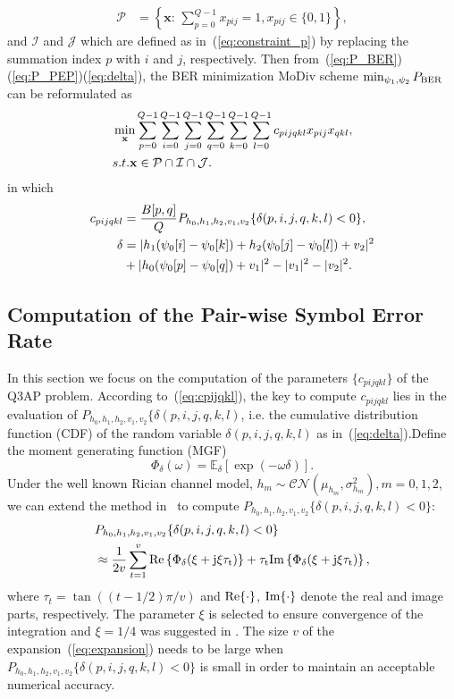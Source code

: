 \documentclass[journal]{IEEEtran}
\newcommand{\BER}{\rm{BER}}
\renewcommand{\Re}{\rm Re}
\renewcommand{\Im}{\rm Im}
\begin{document}
\begin{align}
    \mathcal{P} & = \left\{\mathbf{x}:\,\sum_{p=0}^{Q-1}x_{pij} = 1,
    x_{pij}\in\{0, 1\}\right\}, \label{eq:constraint_p}
\end{align}
and $\mathcal{I}$ and $\mathcal{J}$ which are defined as
in~(\ref{eq:constraint_p}) by replacing the summation index $p$ with $i$ and
$j$, respectively. Then from~(\ref{eq:P_BER})(\ref{eq:P_PEP})(\ref{eq:delta}),
the BER minimization MoDiv scheme $\min_{\psi_1, \psi_2}P_{\BER}$ can be
reformulated as
\begin{align}
    & \min_{\mathbf{x}}\sum_{p=0}^{Q-1}\sum_{i=0}^{Q-1}\sum_{j=0}^{Q-1}
    \sum_{q=0}^{Q-1}\sum_{k=0}^{Q-1}\sum_{l=0}^{Q-1}c_{pijqkl}x_{pij}x_{qkl},
    \label{eq:Q3AP}\\
    & \mbox{s.t. } \mathbf{x}\in \mathcal{P}\cap\mathcal{I}\cap\mathcal{J}.
    \notag
\end{align}
in which
\begin{align}
    c_{pijqkl} & = \frac{B[p, q]}{Q}P_{h_0,h_1,h_2,v_1,v_2}\{\delta(p,i,j,q,k,l)
    < 0\},
    \label{eq:cpijqkl} \\
    \delta & = |h_1(\psi_0[i] - \psi_0[k])+h_2(\psi_0[j] - \psi_0[l])+v_2|^2 
 \notag
    \\
    &
       + |h_0(\psi_0[p] - \psi_0[q]) + v_1|^2 - |v_1|^2 -
    |v_2|^2.\label{eq:delta_pijqkl}
\end{align}

\subsection{Computation of the Pair-wise Symbol Error Rate}

In this section we focus on the computation of the parameters $\{c_{pijqkl}\}$
of the Q3AP problem. According to~(\ref{eq:cpijqkl}), the key to compute
$c_{pijqkl}$ lies in the evaluation of
$P_{h_0,h_1,h_2,v_1,v_2}\{\delta(p,i,j,q,k,l)$, i.e. the cumulative distribution
function (CDF) of the random variable $\delta(p,i,j,q,k,l)$ as
in~(\ref{eq:delta}).Define the moment generating function (MGF)
\[\Phi_{\delta}(\omega) = \mathbb{E}_{\delta}[\exp(-\omega\delta)].\]
Under the well known Rician channel model, 
$h_m\sim\mathcal{CN}(\mu_{h_m},\sigma_{h_m}^2), m=0,1,2$, we 
can extend the method
in~\cite{harvind2005symbol, taricco2002exact} to compute
$P_{h_0,h_1,h_2,v_1,v_2}\{\delta(p,i,j,q,k,l) < 0\}$:
\begin{align}
    & P_{h_0,h_1,h_2,v_1,v_2}\{\delta(p,i,j,q,k,l) < 0\} \notag \\
    & \approx \frac{1}{2v}\sum_{t=1}^v \Re\left\{\Phi_{\delta}(\xi +
    j\xi\tau_t)\right\} + \tau_t\Im\left\{\Phi_{\delta}(\xi +
    j\xi\tau_t)\right\},
    \label{eq:expansion}
\end{align}
where $\tau_t = \tan((t- 1/2)\pi/v)$
and $\Re\{\cdot\}$, $\Im\{\cdot\}$ denote the real and image parts,
respectively. 
The parameter $\xi$ is selected to ensure convergence of the
integration and $\xi = 1/4$ was suggested in \cite{taricco2002exact}. The
size $v$ of the expansion~(\ref{eq:expansion}) needs to be large when $
P_{h_0,h_1,h_2,v_1,v_2}\{\delta(p,i,j,q,k,l) < 0\}$ is small in order to
maintain an acceptable numerical accuracy.
\end{document}
